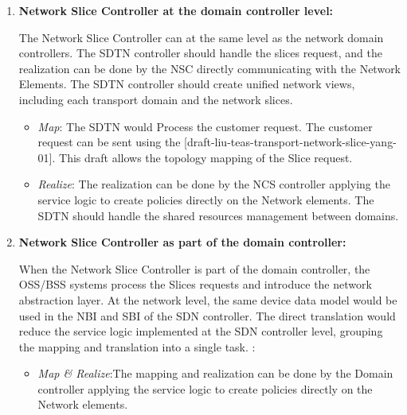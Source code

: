 \documentclass[journal,article,submit,moreauthors,pdftex]{Definitions/mdpi}
\begin{document}
\begin{enumerate}[label=(\alph*)]
    \item \textbf{Network Slice Controller at the domain controller level:}

The Network Slice Controller can at the same level as the network domain controllers. The SDTN controller should handle the slices request, and the realization can be done by the NSC directly communicating with the Network Elements. The SDTN controller should create unified network views, including each transport domain and the network slices.

\begin{itemize}

    \item \textit{Map}: The SDTN would Process the customer request. The customer request can be sent using the [draft-liu-teas-transport-network-slice-yang-01]. This draft allows the topology mapping of the Slice request. 
    
    \item \textit{Realize}: The realization can be done by the NCS controller applying the service logic to create policies directly on the Network elements. The SDTN should handle the shared resources management between domains. 
\end{itemize}    
    
    \item \textbf{Network Slice Controller as part of the domain controller:}
    
When the Network Slice Controller is part of the domain controller, the OSS/BSS systems process the Slices requests and introduce the network abstraction layer. At the network level, the same device data model would be used in the NBI and SBI of the SDN controller. The direct translation would reduce the service logic implemented at the SDN controller level, grouping the mapping and translation into a single task. :

\begin{itemize}
    \item  \textit{Map & Realize}:The mapping and realization can be done by the Domain controller applying the service logic to create policies directly on the Network elements.
\end{itemize}

\end{enumerate}
\end{document}
